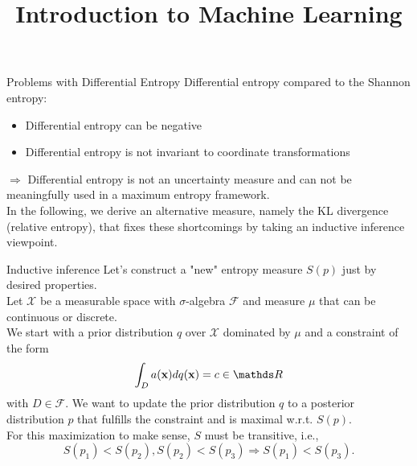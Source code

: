 \documentclass[11pt,compress,t,notes=noshow, xcolor=table]{beamer}
\title{Introduction to Machine Learning}
\date{}
\begin{document}

\begin{vbframe} {Problems with Differential Entropy}
Differential entropy compared to the Shannon entropy:
\begin{itemize}
    \item Differential entropy can be negative
    \item Differential entropy is not invariant to coordinate transformations
\end{itemize}
$\Rightarrow$ Differential entropy is not an uncertainty measure and can not be meaningfully used in a maximum entropy framework. \\
\lz 
In the following, we derive an alternative measure, namely the KL divergence (relative entropy), that fixes these shortcomings by taking an inductive inference viewpoint.  
\end{vbframe}
\begin{vbframe}{Inductive inference}
    Let's construct a "new" entropy measure $S(p)$ just by desired properties.\\
    \lz
    Let $\mathcal{X}$ be a measurable space with $\sigma$-algebra $\mathcal{F}$ and measure $\mu$ that can be continuous or discrete. \\
    We start with a prior distribution $q$ over $\mathcal{X}$ dominated by $\mu$ and a constraint of the form $$\int_D a(\xv) dq(\xv) = c \in \R$$
    with $D \in \mathcal{F}.$
    We want to update the prior distribution $q$ to a posterior distribution $p$ that fulfills the constraint and is maximal w.r.t. $S(p).$  \\
    \lz
    For this maximization to make sense, $S$ must be transitive, i.e., 
    $$S(p_1) < S(p_2), S(p_2) < S(p_3) \Rightarrow S(p_1) < S(p_3).$$
\end{vbframe}
\end{document}
